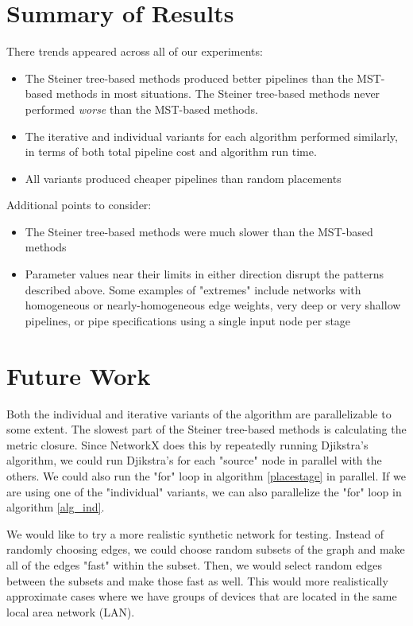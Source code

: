 \documentclass{acmart}
\begin{document}
 	\section{Summary of Results}
 	There trends appeared across all of our experiments:
 	\begin{itemize}
 	    \item The Steiner tree-based methods produced better pipelines than the MST-based methods in most situations. The Steiner tree-based methods never performed \textit{worse} than the MST-based methods.
 	    \item The iterative and individual variants for each algorithm performed similarly, in terms of both total pipeline cost and algorithm run time.
 	    \item All variants produced cheaper pipelines than random placements
 	\end{itemize}
 	Additional points to consider:
 	\begin{itemize}
 	    \item The Steiner tree-based methods were much slower than the MST-based methods
 	    \item Parameter values near their limits in either direction disrupt the patterns described above. Some examples of "extremes" include networks with homogeneous or nearly-homogeneous edge weights, very deep or very shallow pipelines, or pipe specifications using a single input node per stage
 	\end{itemize}
    
 	\section{Future Work}
 	Both the individual and iterative variants of the algorithm are parallelizable to some extent. The slowest part of the Steiner tree-based methods is calculating the metric closure. Since NetworkX does this by repeatedly running Djikstra's algorithm, we could run Djikstra's for each "source" node in parallel with the others. We could also run the "for" loop in algorithm \ref{placestage} in parallel. If we are using one of the "individual" variants, we can also parallelize the "for" loop in algorithm \ref{alg_ind}.
 	
 	We would like to try a more realistic synthetic network for testing. Instead of randomly choosing edges, we could choose random subsets of the graph and make all of the edges "fast" within the subset. Then, we would select random edges between the subsets and make those fast as well. This would more realistically approximate cases where we have groups of devices that are located in the same local area network (LAN).
 	
\end{document}
